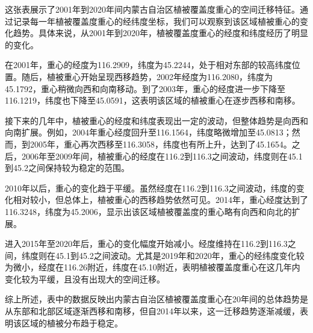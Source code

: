 \documentclass{article}
\begin{document}
		
		这张表展示了2001年到2020年间内蒙古自治区植被覆盖度重心的空间迁移特征。通过记录每一年植被覆盖度重心的经纬度坐标，我们可以观察到该区域植被重心的变化趋势。具体来说，从2001年到2020年，植被覆盖度重心的经度和纬度经历了明显的变化。
		
		在2001年，重心的经度为116.2909，纬度为45.2244，处于相对东部的较高纬度位置。随后，植被重心开始呈现西移趋势，2002年经度为116.2080，纬度为45.1792，重心稍微向西和向南移动。到了2003年，重心的经度进一步下降至116.1219，纬度也下降至45.0591，这表明该区域的植被重心在逐步西移和南移。
		
		接下来的几年中，植被重心的经度和纬度表现出一定的波动，但整体趋势是向西和向南扩展。例如，2004年重心经度回升至116.1564，纬度略微增加至45.0813；然而，到2005年，重心再次西移至116.3058，纬度也有所上升，达到了45.1654。之后，2006年至2009年间，植被重心的经度在116.2到116.3之间波动，纬度则在45.1到45.2之间保持较为稳定的范围。
		
		2010年以后，重心的变化趋于平缓。虽然经度在116.2到116.3之间波动，纬度的变化相对较小，但总体上，植被重心的西移趋势依然可见。2014年，重心经度达到了116.3248，纬度为45.2006，显示出该区域植被覆盖度的重心略有向西和向北的扩展。
		
		进入2015年至2020年后，重心的变化幅度开始减小。经度维持在116.2到116.3之间，纬度则在45.1到45.2之间波动。尤其是2019年和2020年，重心的经纬度变化较为微小，经度在116.26附近，纬度在45.10附近，表明植被覆盖度重心在这几年内变化较为平缓，且没有出现大的空间迁移。
		
		综上所述，表中的数据反映出内蒙古自治区植被覆盖度重心在20年间的总体趋势是从东部和北部区域逐渐西移和南移，但自2014年以来，这一迁移趋势逐渐减缓，表明该区域的植被分布趋于稳定。
		
		
		
\end{document}

